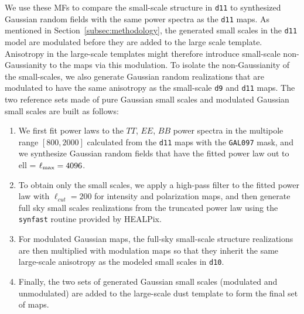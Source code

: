 \documentclass[twocolumn]{aastex631}
\begin{document}
We use these MFs to compare the small-scale structure in \texttt{d11} to synthesized Gaussian random fields with the same power spectra as the \texttt{d11} maps.
As mentioned in Section~\ref{subsec:methodology}, the generated small scales in the \texttt{d11} model are modulated before they are added to the large scale template. Anisotropy in the large-scale templates might therefore introduce small-scale non-Gaussianity to the maps via this modulation. %
To isolate the non-Gaussianity of the small-scales, we also generate Gaussian random realizations that are modulated to have the same anisotropy as the small-scale \texttt{d9} and \texttt{d11} maps. The two reference sets made of pure Gaussian small scales and modulated Gaussian small scales are built as follows:

\begin{enumerate}

\item We first fit power laws to the $TT$, $EE$, $BB$ power spectra in the multipole range $[800, 2000]$ calculated from the \texttt{d11} maps with the \texttt{GAL097} mask, and we synthesize Gaussian random fields that have the fitted power law out to ell = $\ell_{\rm max}=4096$. 

\item To obtain only the small scales, we apply a high-pass filter to the fitted power law with $\ell_{cut} = 200$ for intensity and polarization maps, and then generate full sky small scales realizations from the truncated power law using the \texttt{synfast} routine provided by HEALPix. 

\item For modulated Gaussian maps, the full-sky small-scale structure realizations are then multiplied with modulation maps so that they inherit the same large-scale anisotropy as the modeled small scales in \texttt{d10}. 


\item Finally, the two sets of generated Gaussian small scales (modulated and unmodulated) are added to the large-scale dust template to form the final set of maps.
\end{enumerate}
\end{document}
